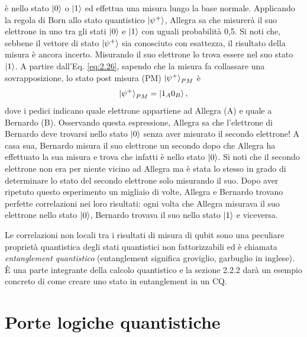 è nello stato $\ket{0}$ o $\ket{1}$ ed effettua una misura lungo la base 
normale. Applicando la regola di Born allo stato quantistico $\ket{\psi^+}$, 
Allegra sa che misurerà il suo elettrone in uno tra gli stati $\ket{0}$ e 
$\ket{1}$ con uguali probabilità 0,5. Si noti che, sebbene il vettore di stato 
$\ket{\psi^+}$ sia conosciuto con esattezza, il risultato della misura è 
ancora incerto. Misurando il suo elettrone lo trova essere nel suo stato 
$\ket{1}$. A partire dall'Eq. \ref{eq:2.26}, sapendo che la misura fa 
collassare una sovrapposizione, lo stato post misura (PM) %
$\ket{\psi^+}_{PM}$ è 
\begin{equation} \label{eq:2.27}
    \ket{\psi^+}_{PM} = \ket{1_A 0_B}, 
\end{equation}
dove i pedici indicano quale elettrone appartiene ad Allegra (A) e quale a 
Bernardo (B). Osservando questa espressione, Allegra sa che l'elettrone di 
Bernardo deve trovarsi nello stato $\ket{0}$ senza aver misurato il secondo 
elettrone! A casa sua, Bernardo misura il suo elettrone un secondo dopo che 
Allegra ha effettuato la sua misura e trova che infatti è nello stato $\ket{0}$. 
Si noti che il secondo elettrone non era per niente vicino ad Allegra ma è stata 
lo stesso in grado di determinare lo stato del secondo elettrone solo misurando 
il suo. Dopo aver ripetuto questo esperimento un migliaio di volte, Allegra e 
Bernardo trovano perfette correlazioni nei loro risultati: ogni volta che Allegra 
misurava il suo elettrone nello stato $\ket{0}$, Bernardo trovava il suo nello 
stato $\ket{1}$ e viceversa. 

Le correlazioni non locali tra i risultati di misura di qubit sono una peculiare 
proprietà quantistica degli stati quantistici non fattorizzabili ed è chiamata 
\emph{entanglement quantistico} (entanglement significa groviglio, garbuglio 
in inglese). 
È una parte integrante della calcolo quantistico e la sezione 2.2.2 darà un 
esempio concreto di come creare uno stato in entanglement in un \ac{CQ}. 

\section{Porte logiche quantistiche}

